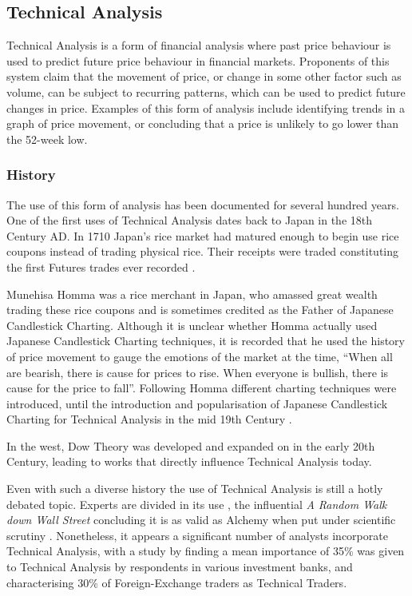 \documentclass{article}
\begin{document}
\subsection{Technical Analysis}

Technical Analysis is a form of financial analysis where past price behaviour is used to predict future price behaviour in financial markets. Proponents of this system claim that the movement of price, or change in some other factor such as volume, can be subject to recurring patterns, which can be used to predict future changes in price. Examples of this form of analysis include identifying trends in a graph of price movement, or concluding that a price is unlikely to go lower than the 52-week low.

\subsubsection{History}

The use of this form of analysis has been documented for several hundred years. One of the first uses of Technical Analysis dates back to Japan in the 18th Century AD. In 1710 Japan's rice market had matured enough to begin use rice coupons instead of trading physical rice. Their receipts were traded constituting the first Futures trades ever recorded \citep[p.15]{jcct1991}. 

Munehisa Homma was a rice merchant in Japan, who amassed great wealth trading these rice coupons and is sometimes credited as the Father of Japanese Candlestick Charting. Although it is unclear whether Homma actually used Japanese Candlestick Charting techniques, it is recorded that he used the history of price movement to gauge the emotions of the market at the time, ``When all are bearish, there is cause for prices to rise. When everyone is bullish, there is cause for the price to fall''. Following Homma different charting techniques were introduced, until the introduction and popularisation of Japanese Candlestick Charting for Technical Analysis in the mid 19th Century \citep[p.18]{jcct1994}.

In the west, Dow Theory was developed and expanded on in the early 20th Century, leading to works \citep{edwards2012technical} that directly influence Technical Analysis today.

Even with such a diverse history the use of Technical Analysis is still a hotly debated topic. Experts are divided in its use \citep{foundations}, the influential \textit{A Random Walk down Wall Street} concluding it is as valid as Alchemy when put under scientific scrutiny \cite[p.159]{randomwalk2012}. Nonetheless, it appears a significant number of analysts incorporate Technical Analysis, with a study by \cite{examininguse1997} finding a mean importance of 35\% was given to Technical Analysis by respondents in various investment banks, and \cite{cheung2000currency} characterising 30\% of Foreign-Exchange traders as Technical Traders. 
\end{document}
